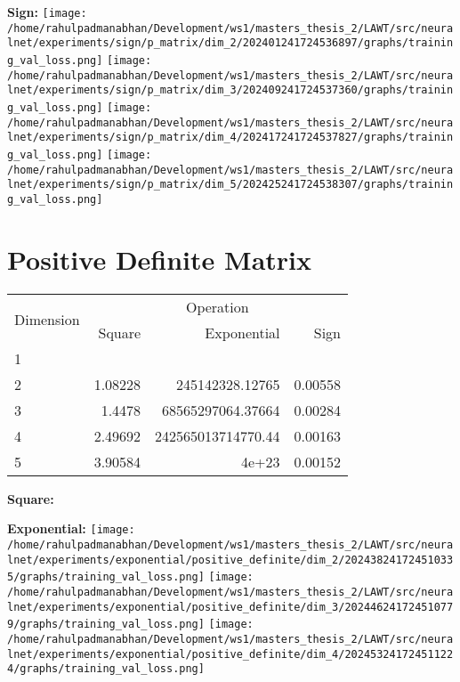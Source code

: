 \documentclass{article}
\begin{document}
\textbf{Sign:}
\texttt{[image: /home/rahulpadmanabhan/Development/ws1/masters\_thesis\_2/LAWT/src/neuralnet/experiments/sign/p\_matrix/dim\_2/202401241724536897/graphs/training\_val\_loss.png]}
\texttt{[image: /home/rahulpadmanabhan/Development/ws1/masters\_thesis\_2/LAWT/src/neuralnet/experiments/sign/p\_matrix/dim\_3/202409241724537360/graphs/training\_val\_loss.png]}
\texttt{[image: /home/rahulpadmanabhan/Development/ws1/masters\_thesis\_2/LAWT/src/neuralnet/experiments/sign/p\_matrix/dim\_4/202417241724537827/graphs/training\_val\_loss.png]}
\texttt{[image: /home/rahulpadmanabhan/Development/ws1/masters\_thesis\_2/LAWT/src/neuralnet/experiments/sign/p\_matrix/dim\_5/202425241724538307/graphs/training\_val\_loss.png]}

\pagebreak
\section{Positive Definite Matrix}
\begin{tabular}{@{}lrrr@{}}
\toprule
\multirow{2}{*}{Dimension} & \multicolumn{3}{c}{Operation} \\
\cmidrule(l){2-4}
& Square & Exponential & Sign \\
\midrule
1 & & & \\
2 & 1.08228 & 245142328.12765 & 0.00558 \\
3 & 1.4478 & 68565297064.37664 & 0.00284 \\
4 & 2.49692 & 242565013714770.44 & 0.00163 \\
5 & 3.90584 & 4e+23 & 0.00152 \\
\bottomrule
\end{tabular}

\textbf{Square:}

\textbf{Exponential:}
\texttt{[image: /home/rahulpadmanabhan/Development/ws1/masters\_thesis\_2/LAWT/src/neuralnet/experiments/exponential/positive\_definite/dim\_2/202438241724510335/graphs/training\_val\_loss.png]}
\texttt{[image: /home/rahulpadmanabhan/Development/ws1/masters\_thesis\_2/LAWT/src/neuralnet/experiments/exponential/positive\_definite/dim\_3/202446241724510779/graphs/training\_val\_loss.png]}
\texttt{[image: /home/rahulpadmanabhan/Development/ws1/masters\_thesis\_2/LAWT/src/neuralnet/experiments/exponential/positive\_definite/dim\_4/202453241724511224/graphs/training\_val\_loss.png]}
\end{document}
